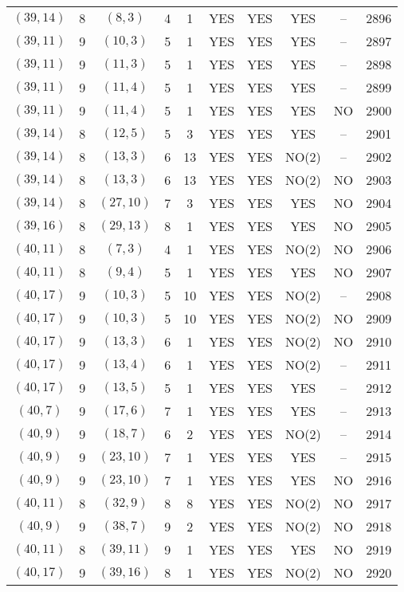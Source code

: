 \begin{longtable}{|c|c|c|c|c|c|c|c|c|c|}
$(39, 14)$ & 8 & $(8, 3)$ & 4 & 1 & YES & YES & YES & -- & 2896\\
$(39, 11)$ & 9 & $(10, 3)$ & 5 & 1 & YES & YES & YES & -- & 2897\\
$(39, 11)$ & 9 & $(11, 3)$ & 5 & 1 & YES & YES & YES & -- & 2898\\
$(39, 11)$ & 9 & $(11, 4)$ & 5 & 1 & YES & YES & YES & -- & 2899\\
$(39, 11)$ & 9 & $(11, 4)$ & 5 & 1 & YES & YES & YES & NO & 2900\\
$(39, 14)$ & 8 & $(12, 5)$ & 5 & 3 & YES & YES & YES & -- & 2901\\
$(39, 14)$ & 8 & $(13, 3)$ & 6 & 13 & YES & YES & NO(2) & -- & 2902\\
$(39, 14)$ & 8 & $(13, 3)$ & 6 & 13 & YES & YES & NO(2) & NO & 2903\\
$(39, 14)$ & 8 & $(27, 10)$ & 7 & 3 & YES & YES & YES & NO & 2904\\
$(39, 16)$ & 8 & $(29, 13)$ & 8 & 1 & YES & YES & YES & NO & 2905\\
$(40, 11)$ & 8 & $(7, 3)$ & 4 & 1 & YES & YES & NO(2) & NO & 2906\\
$(40, 11)$ & 8 & $(9, 4)$ & 5 & 1 & YES & YES & YES & NO & 2907\\
$(40, 17)$ & 9 & $(10, 3)$ & 5 & 10 & YES & YES & NO(2) & -- & 2908\\
$(40, 17)$ & 9 & $(10, 3)$ & 5 & 10 & YES & YES & NO(2) & NO & 2909\\
$(40, 17)$ & 9 & $(13, 3)$ & 6 & 1 & YES & YES & NO(2) & NO & 2910\\
$(40, 17)$ & 9 & $(13, 4)$ & 6 & 1 & YES & YES & NO(2) & -- & 2911\\
$(40, 17)$ & 9 & $(13, 5)$ & 5 & 1 & YES & YES & YES & -- & 2912\\
$(40, 7)$ & 9 & $(17, 6)$ & 7 & 1 & YES & YES & YES & -- & 2913\\
$(40, 9)$ & 9 & $(18, 7)$ & 6 & 2 & YES & YES & NO(2) & -- & 2914\\
$(40, 9)$ & 9 & $(23, 10)$ & 7 & 1 & YES & YES & YES & -- & 2915\\
$(40, 9)$ & 9 & $(23, 10)$ & 7 & 1 & YES & YES & YES & NO & 2916\\
$(40, 11)$ & 8 & $(32, 9)$ & 8 & 8 & YES & YES & NO(2) & NO & 2917\\
$(40, 9)$ & 9 & $(38, 7)$ & 9 & 2 & YES & YES & NO(2) & NO & 2918\\
$(40, 11)$ & 8 & $(39, 11)$ & 9 & 1 & YES & YES & YES & NO & 2919\\
$(40, 17)$ & 9 & $(39, 16)$ & 8 & 1 & YES & YES & NO(2) & NO & 2920\\

\end{longtable}
